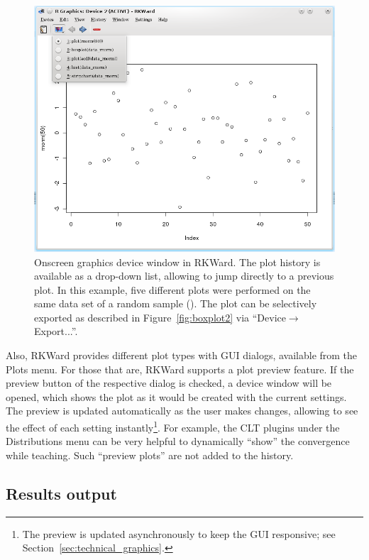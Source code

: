 \begin{figure}[htp]
 \centering
 \includegraphics{../figures/plot_history_cropped.png}
 \caption{Onscreen graphics device window in RKWard. The plot history is 
  available as a drop-down list, allowing to jump directly to a previous 
  plot. In this example, five different plots were performed on the same data 
  set of a random sample (). The plot can be 
  selectively exported as described in Figure~\ref{fig:boxplot2} via ``Device$\rightarrow$Export...''.
}
 \label{fig:plot_history}
\end{figure}

Also, RKWard provides different plot types with GUI dialogs,
available from the Plots menu. For those that are, RKWard supports a plot
preview feature. If the preview button of
the respective dialog is checked, a device window will be opened, which
shows the plot as it would be created with the current settings. The
preview is updated automatically as the user makes changes, allowing to
see the effect of each setting instantly\footnote{The preview is
updated asynchronously to keep the GUI responsive; see Section~\ref{sec:technical_graphics}.}. For example, the CLT plugins
under the Distributions menu can be very helpful to dynamically ``show''
the convergence while teaching. Such ``preview plots'' are not added to
the history.

\subsection{Results output}
\label{sec:results_output}


